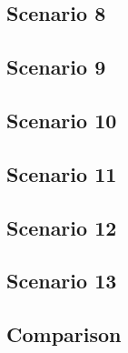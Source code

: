 \subsection{Scenario 8}

\subsection{Scenario 9}

\subsection{Scenario 10}

\subsection{Scenario 11}

\subsection{Scenario 12}

\subsection{Scenario 13}

\subsection{Comparison}